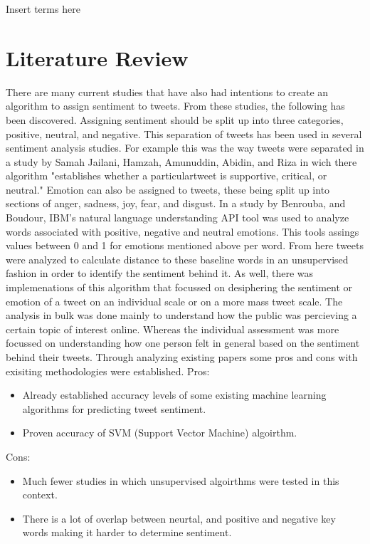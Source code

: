 \documentclass[conference]{IEEEtran}
\begin{document}
\begin{IEEEkeywords}
Insert terms here
\end{IEEEkeywords}

\section{Literature Review}
There are many current studies that have also had intentions to create an algorithm to assign sentiment to tweets.  
From these studies, the following has been discovered.
Assigning sentiment should be split up into three categories, positive, neutral, and negative.
This separation of tweets has been used in several sentiment analysis studies.
For example this was the way tweets were separated in a study by Samah Jailani, Hamzah, Amunuddin, Abidin, and Riza in wich there algorithm "establishes whether a particulartweet is supportive, critical, or neutral\cite{b2}."
Emotion can also be assigned to tweets, these being split up into sections of anger, sadness, joy, fear, and disgust. 
In a study by Benrouba, and Boudour, IBM's natural language understanding API tool was used to analyze words associated with positive, negative and neutral emotions\cite{b1}.
This tools assings values between 0 and 1 for emotions mentioned above per word. 
From here tweets were analyzed to calculate distance to these baseline words in an unsupervised fashion in order to identify the sentiment behind it. 
As well, there was implemenations of this algorithm that focussed on desiphering the sentiment or emotion of a tweet on an individual scale or on a more mass tweet scale.
The analysis in bulk was done mainly to understand how the public was percieving a certain topic of interest online. 
Whereas the individual assessment was more focussed on understanding how one person felt in general based on the sentiment behind their tweets. 
Through analyzing existing papers some pros and cons with exisiting methodologies were established. \newline
\newline
Pros: 
\begin{itemize}
    \item Already established accuracy levels of some existing machine learning algorithms for predicting tweet sentiment.
    \item Proven accuracy of SVM (Support Vector Machine) algoirthm.
\end{itemize}
Cons:
\begin{itemize}
    \item Much fewer studies in which unsupervised algoirthms were tested in this context.
    \item There is a lot of overlap between neurtal, and positive and negative key words making it harder to determine sentiment.
\end{itemize}
\end{document}
